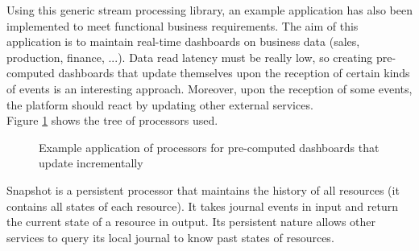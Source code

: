 Using this generic stream processing library, an example application has also been implemented to meet functional business requirements. The aim of this application is to
maintain real-time dashboards on business data (sales, production, finance, ...). Data read latency must be really low, so creating pre-computed dashboards that
update themselves upon the reception of certain kinds of events is an interesting approach. Moreover, upon the reception of some events, the platform should react by updating other external services.
\\

Figure \ref{fig:exampleapp} shows the tree of processors used. 

\begin{figure}[h]
  \begin{center} 
    \caption{Example application of processors for pre-computed dashboards that update incrementally}
    \label{fig:exampleapp}
  \end{center}
\end{figure}

Snapshot is a persistent processor that maintains the history of all resources (it contains all states of each resource). It takes journal events in input and return the current
state of a resource in output. Its persistent nature allows other services to query its local journal to know past states of resources.

